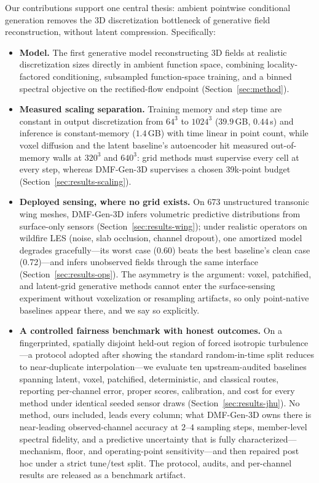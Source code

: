 \documentclass{article} %
\newcommand{\model}{DMF-Gen-3D}
\begin{document}
Our contributions support one central thesis: ambient pointwise conditional generation removes the 3D discretization bottleneck of generative field reconstruction, without latent compression. Specifically:
\begin{itemize}
\item \textbf{Model.} The first generative model reconstructing 3D fields at realistic discretization sizes directly in ambient function space, combining locality-factored conditioning, subsampled function-space training, and a binned spectral objective on the rectified-flow endpoint (Section~\ref{sec:method}).
\item \textbf{Measured scaling separation.} Training memory and step time are constant in output discretization from $64^3$ to $1024^3$ ($39.9$\,GB, $0.44$\,s) and inference is constant-memory ($1.4$\,GB) with time linear in point count, while voxel diffusion and the latent baseline's autoencoder hit measured out-of-memory walls at $320^3$ and $640^3$: grid methods must supervise every cell at every step, whereas \model{} supervises a chosen 39k-point budget (Section~\ref{sec:results-scaling}).
\item \textbf{Deployed sensing, where no grid exists.} On 673 unstructured transonic wing meshes, \model{} infers volumetric predictive distributions from surface-only sensors (Section~\ref{sec:results-wing}); under realistic operators on wildfire LES (noise, slab occlusion, channel dropout), one amortized model degrades gracefully---its worst case (0.60) beats the best baseline's clean case (0.72)---and infers unobserved fields through the same interface (Section~\ref{sec:results-ops}). The asymmetry is the argument: voxel, patchified, and latent-grid generative methods cannot enter the surface-sensing experiment without voxelization or resampling artifacts, so only point-native baselines appear there, and we say so explicitly.
\item \textbf{A controlled fairness benchmark with honest outcomes.} On a fingerprinted, spatially disjoint held-out region of forced isotropic turbulence---a protocol adopted after showing the standard random-in-time split reduces to near-duplicate interpolation---we evaluate ten upstream-audited baselines spanning latent, voxel, patchified, deterministic, and classical routes, reporting per-channel error, proper scores, calibration, and cost for every method under identical seeded sensor draws (Section~\ref{sec:results-jhu}). No method, ours included, leads every column; what \model{} owns there is near-leading observed-channel accuracy at $2$--$4$ sampling steps, member-level spectral fidelity, and a predictive uncertainty that is fully characterized---mechanism, floor, and operating-point sensitivity---and then repaired post hoc under a strict tune/test split. The protocol, audits, and per-channel results are released as a benchmark artifact.
\end{itemize}
\end{document}
